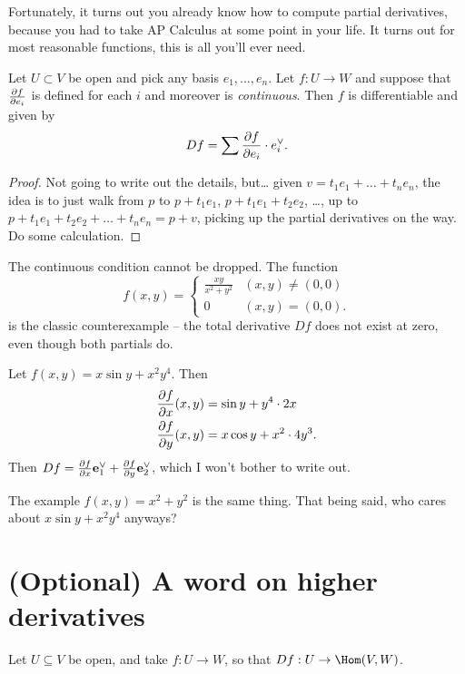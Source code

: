 Fortunately, it turns out you already know how to compute partial derivatives,
because you had to take AP Calculus at some point in your life.
It turns out for most reasonable functions, this is all you'll ever need.
\begin{theorem}
	Let $U \subset V$ be open and pick any basis $e_1, \dots, e_n$.
	Let $f : U \to W$ and suppose that $\frac{\partial f}{\partial e_i}$ is defined
	for each $i$ and moreover is \emph{continuous}.
	Then $f$ is differentiable and given by
	\[ Df = \sum \frac{\partial f}{\partial e_i} \cdot e_i^\vee. \]
\end{theorem}
\begin{proof}
	Not going to write out the details, but\dots
	given $v = t_1e_1 + \dots + t_ne_n$,
	the idea is to just walk from $p$ to $p+t_1e_1$, $p+t_1e_1+t_2e_2$, \dots,
	up to $p+t_1e_1+t_2e_2+\dots+t_ne_n = p+v$,
	picking up the partial derivatives on the way.
	Do some calculation.
\end{proof}

\begin{remark}
	The continuous condition cannot be dropped. The function
	\[
			f(x,y)
		=
		\begin{cases}
			\frac{xy}{x^2+y^2} & (x,y) \neq (0,0) \\
			0 & (x,y) = (0,0).
		\end{cases}
	\]
	is the classic counterexample -- the total derivative $Df$ does not exist at zero,
	even though both partials do.
\end{remark}

\begin{example}
	Let $f(x,y) = x \sin y + x^2y^4$. Then
	\begin{align*}
		\frac{\partial f}{\partial x} (x,y) &= \sin y + y^4 \cdot 2x \\
		\frac{\partial f}{\partial y} (x,y) &= x \cos y + x^2 \cdot 4y^3.
	\end{align*}
	Then $Df = \frac{\partial f}{\partial x} \mathbf e_1^\vee + \frac{\partial f}{\partial y} \mathbf e_2^\vee$,
	which I won't bother to write out.
\end{example}

The example $f(x,y) = x^2+y^2$ is the same thing.
That being said, who cares about $x \sin y + x^2y^4$ anyways?

\section{(Optional) A word on higher derivatives}
Let $U \subseteq V$ be open, and take $f : U \to W$, so that $Df : U \to \Hom(V,W)$.

